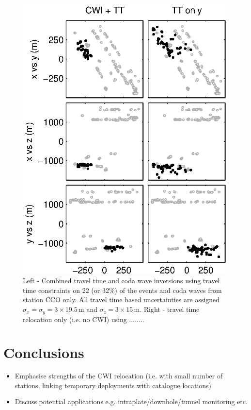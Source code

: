\documentclass[extra]{gji}
\begin{document}
\begin{figure}
\noindent\includegraphics{diags/CalaverasLoc6.eps}
\caption{Left - Combined travel time and coda wave inversions using travel time constraints on
22 (or 32\%) of the events and coda waves from station CCO only. All travel time based uncertainties
are assigned $\sigma_x = \sigma_y = 3 \times19.5$\,m and $\sigma_z = 3\times15$\,m. Right - travel time
relocation only (i.e. no CWI) using ........}
\label{fig-68Calaverasevents_ttsubsetandcoda1}
\end{figure}

\section{Conclusions}
\begin{itemize}
\item Emphasise strengths of the CWI relocation (i.e. with small number of stations,
linking temporary deployments with catalogue locations)
\item Discuss potential applications e.g. intraplate/downhole/tunnel monitoring etc.
\end{itemize}
\end{document}
